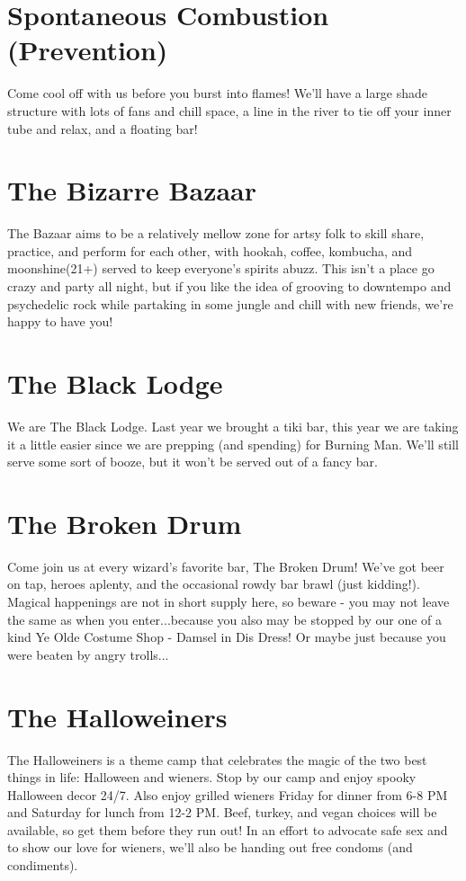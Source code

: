 \section*{Spontaneous Combustion (Prevention)}
Come cool off with us before you burst into flames! We'll have a large shade structure with lots of fans and chill space, a line in the river to tie off your inner tube and relax, and a floating bar! 


\section*{The Bizarre Bazaar}
The Bazaar aims to be a relatively mellow zone for artsy folk to skill share, practice, and perform for each other, with hookah, coffee, kombucha, and moonshine(21+) served to keep everyone's spirits abuzz. This isn't a place go crazy and party all night, but if you like the idea of grooving to downtempo and psychedelic rock while partaking in some jungle and chill with new friends, we're happy to have you! 


\section*{The Black Lodge}
We are The Black Lodge. Last year we brought a tiki bar, this year we are taking it a little easier since we are prepping (and spending) for Burning Man. We'll still serve some sort of booze, but it won't be served out of a fancy bar. 


\section*{The Broken Drum}
Come join us at every wizard's favorite bar, The Broken Drum! We've got beer on tap, heroes aplenty, and the occasional rowdy bar brawl (just kidding!). Magical happenings are not in short supply here, so beware - you may not leave the same as when you enter...because you also may be stopped by our one of a kind Ye Olde Costume Shop - Damsel in Dis Dress! Or maybe just because you were beaten by angry trolls... 



\section*{The Halloweiners}
The Halloweiners is a theme camp that celebrates the magic of the two best things in life: Halloween and wieners. Stop by our camp and enjoy spooky Halloween decor 24/7. Also enjoy grilled wieners Friday for dinner from 6-8 PM and Saturday for lunch from 12-2 PM. Beef, turkey, and vegan choices will be available, so get them before they run out! In an effort to advocate safe sex and to show our love for wieners, we'll also be handing out free condoms (and condiments). 


